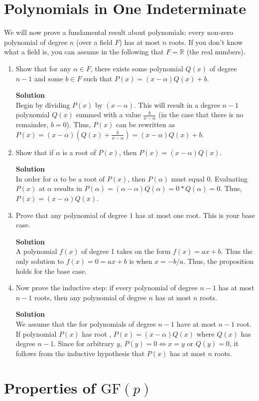 \documentclass[11pt]{article}
\newcommand*{\Question}[1]{\section{#1}}
\newenvironment{Parts}{\begin{enumerate}[label=(\alph*)]}{\end{enumerate}}
\newcommand*{\Part}{\item}
\newenvironment{Answer}{\vspace{10pt}\begin{mdframed}\textbf{Solution}\\}{\end{mdframed}\vfill\pagebreak[3]}
\newenvironment{Answer}{\vspace{10pt}}{\vfill\pagebreak[3]}
\newcommand*{\GF}{\text{GF}}
\begin{document}
\Question{Polynomials in One Indeterminate}

We will now prove a fundamental result about polynomials: every non-zero
polynomial of degree $n$ (over a field $F$) has at most $n$ roots. If
you don't know what a field is, you can assume in the following that
$F = \mathbb{R}$ (the real numbers).
\begin{Parts}
    \Part Show that for any $\alpha \in F$, there exists some polynomial $Q(x)$
    of degree $n-1$ and some $b \in F$ such that $P(x) = (x-\alpha)Q(x) + b$.
    \begin{Answer}
        Begin by dividing $P(x)$ by $(x-\alpha)$. This will result in a degree $n-1$ polynomial $Q(x)$ summed with a value $\frac{b}{x-\alpha}$ (in the case that there is no remainder, $b=0$). Thus, $P(x)$ can be rewritten as $P(x)=(x-\alpha)(Q(x)+\frac{b}{x-\alpha})=(x-\alpha)Q(x)+b$.
    \end{Answer}

    \Part Show that if $\alpha$ is a root of $P(x)$, then $P(x) =
    (x-\alpha)Q(x)$.
    \begin{Answer}
        In order for $\alpha$ to be a root of $P(x)$, then $P(\alpha)$ must equal 0. Evaluating $P(x)$ at $\alpha$ results in $P(\alpha)=(\alpha-\alpha)Q(\alpha)=0*Q(\alpha)=0$. Thus, $P(x)=(x-\alpha)Q(x)$.
    \end{Answer}

    \Part Prove that any polynomial of degree $1$ has at most one
    root. This is your base case.
    \begin{Answer}
        A polynomial $f(x)$ of degree 1 takes on the form $f(x)=ax+b$. Thus the only solution to $f(x)=0=ax+b$ is when $x=-b/a$. Thus, the proposition holds for the base case.
    \end{Answer}

    \Part Now prove the inductive step: if every polynomial of degree
    $n-1$ has at most $n-1$ roots, then any polynomial of degree $n$ has
    at most $n$ roots.
    \begin{Answer}
        We assume that the for polynomials of degree $n-1$ have at most $n-1$ root. If polynomial $P(x)$ has root \alpha, $P(x)=(x-\alpha)Q(x)$ where $Q(x)$ has degree $n-1$. Since for arbitrary $y$, $P(y)=0 \iff x=y$ or $Q(y)=0$, it follows from the inductive hypothesis that $P(x)$ has at most $n$ roots.
    \end{Answer}
\end{Parts}


\Question{Properties of $\GF(p)$}
\end{document}
